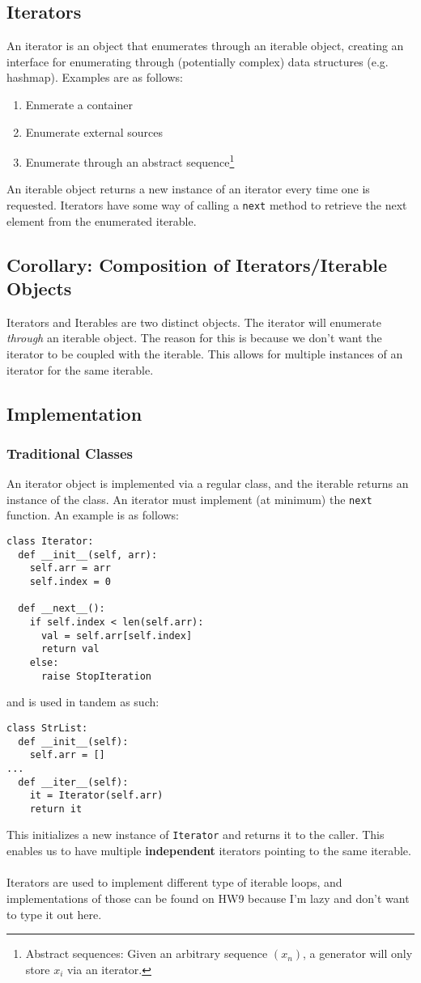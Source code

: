 \documentclass{article}
\begin{document}
\subsection{Iterators}
An iterator is an object that enumerates through an iterable object,
creating an interface for enumerating through (potentially complex)
data structures (e.g. hashmap). Examples are as follows:
\begin{enumerate}[label=(\roman*)]
\item Enmerate a container
\item Enumerate external sources
\item Enumerate through an abstract sequence\footnote{Abstract
    sequences: Given an arbitrary sequence $(x_n)$, a generator will
    only store $x_i$ via an iterator.}
\end{enumerate}
An iterable object returns a new instance of an iterator every time
one is requested. Iterators have some way of calling a \texttt{next}
method to retrieve the next element from the enumerated iterable.

\subsection*{Corollary: Composition of Iterators/Iterable Objects}
Iterators and Iterables are two distinct objects. The iterator will
enumerate \textit{through} an iterable object. The reason for this
is because we don't want the iterator to be coupled with the
iterable. This allows for multiple instances of an iterator for the
same iterable.

\subsection{Implementation}
\subsubsection{Traditional Classes}
An iterator object is implemented via a regular class, and the
iterable returns an instance of the class. An iterator must implement
(at minimum) the \texttt{next} function. An example is as follows: 
\begin{verbatim}
class Iterator:
  def __init__(self, arr):
    self.arr = arr
    self.index = 0

  def __next__():
    if self.index < len(self.arr):
      val = self.arr[self.index]
      return val
    else:
      raise StopIteration
\end{verbatim}
and is used in tandem as such:
\begin{verbatim}
class StrList:
  def __init__(self):
    self.arr = []
...
  def __iter__(self):
    it = Iterator(self.arr)
    return it
\end{verbatim}
This initializes a new instance of \texttt{Iterator} and returns it to
the caller. This enables us to have multiple \textbf{independent}
iterators pointing to the same iterable. \\ \\
Iterators are used to implement different type of iterable loops, and
implementations of those can be found on HW9 because I'm lazy and
don't want to type it out here.
\end{document}
